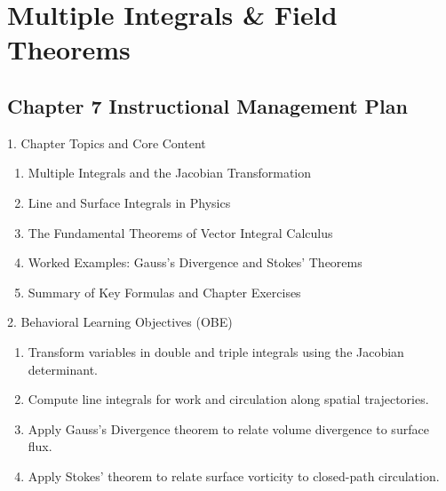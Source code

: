 \chapter{Multiple Integrals \& Field Theorems}

\section*{Chapter 7 Instructional Management Plan}

\begin{planbox}[colframe=rbruNavy, colbacktitle=rbruNavy]{1. Chapter Topics and Core Content}
\begin{enumerate}[topsep=2pt, itemsep=1pt, partopsep=0pt, parsep=0pt, leftmargin=1.5em]
    \item Multiple Integrals and the Jacobian Transformation
    \item Line and Surface Integrals in Physics
    \item The Fundamental Theorems of Vector Integral Calculus
    \item Worked Examples: Gauss's Divergence and Stokes' Theorems
    \item Summary of Key Formulas and Chapter Exercises
\end{enumerate}
\end{planbox}

\begin{planbox}[colframe=rbruGreen, colbacktitle=rbruGreen]{2. Behavioral Learning Objectives (OBE)}
\begin{enumerate}[topsep=2pt, itemsep=1pt, partopsep=0pt, parsep=0pt, leftmargin=1.5em]
    \item Transform variables in double and triple integrals using the Jacobian determinant.
    \item Compute line integrals for work and circulation along spatial trajectories.
    \item Apply Gauss's Divergence theorem to relate volume divergence to surface flux.
    \item Apply Stokes' theorem to relate surface vorticity to closed-path circulation.
\end{enumerate}
\end{planbox}

